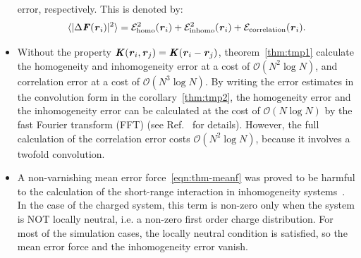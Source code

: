\documentclass[aps,pre,preprint,unsortedaddress]{revtex4}
\renewcommand{\v}[1]{\textbf{\textit{#1}}}
\begin{document}
\begin{itemize}
  error, respectively.
  This is denoted by:
  \begin{align}\label{eqn:error-split}
    \langle\vert\Delta\v F(\v r_i)\vert^2\rangle
    =
    \mathcal E^2_{\textrm{homo}}(\v r_i) +
    \mathcal E^2_{\textrm{inhomo}}(\v r_i) +
    \mathcal E_{\textrm{correlation}}(\v r_i).
  \end{align}
\item
  Without the property $\v K(\v r_i,\v r_j) = \v K(\v r_i - \v r_j)$,
  theorem~\ref{thm:tmp1} calculate the homogeneity and inhomogeneity
  error at a cost of $\mathcal O(N^2\log N)$, and correlation error
  at a cost of $\mathcal O(N^3\log N)$.
  By writing the error estimates in the convolution form in
  the corollary~\ref{thm:tmp2},
  the homogeneity error and the inhomogeneity
  error can be calculated at the cost of $\mathcal O(N\log N)$ by the
  fast Fourier transform (FFT) (see Ref.~\cite{wang2012} for details).
  However, the full calculation of the correlation error costs $\mathcal
  O(N^2\log N)$, because it involves a twofold convolution.
\item A non-varnishing mean error force~\eqref{eqn:thm-meanf} was proved
  to be
  harmful to the calculation of the short-range interaction
  in inhomogeneity systems~\cite{wang2012}.
  In the case of the charged system, this
  term is non-zero only when the system is NOT locally neutral,
  i.e. a non-zero first order charge distribution. For
  most of the simulation cases, the locally neutral condition is
  satisfied, so the mean error force and the inhomogeneity error
  vanish.
\end{itemize}
\end{document}
